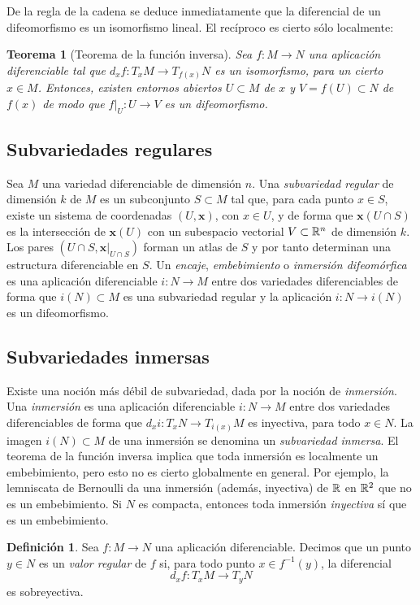 \documentclass[11pt,a4paper]{amsbook}
\newtheorem{thm}[subsection]{Teorema}
\theoremstyle{remark} \newtheorem{rmk}[subsection]{Observación}
\theoremstyle{definition} \newtheorem{defn}[subsection]{Definición}
\theoremstyle{definition} \newtheorem{ex}[subsection]{Ejemplo}
\theoremstyle{definition} \newtheorem{ej}[subsection]{Ejercicio}
\begin{document}
De la regla de la cadena se deduce inmediatamente que la diferencial de un difeomorfismo es un isomorfismo lineal. El recíproco es cierto sólo localmente:

\begin{thm}[Teorema de la función inversa]
Sea $f:M\rightarrow N$ una aplicación diferenciable tal que $d_xf:T_xM\rightarrow T_{f(x)}N$ es un isomorfismo, para un cierto $x\in M$. Entonces, existen entornos abiertos $U\subset M$ de $x$ y $V=f(U)\subset N$ de $f(x)$ de modo que $f|_U:U\rightarrow V$ es un difeomorfismo.
\end{thm}

\subsection{Subvariedades regulares} Sea $M$ una variedad diferenciable de dimensión $n$. Una \emph{subvariedad regular} de dimensión $k$ de $M$ es un subconjunto $S\subset M$ tal que, para cada punto $x\in S$, existe un sistema de coordenadas $(U,\bm{x})$, con $x\in U$, y de forma que $\bm{x}(U\cap S)$ es la intersección de $\bm{x}(U)$ con un subespacio vectorial $V\subset \mathbb R^n$ de dimensión $k$. Los pares $(U\cap S, \bm{x}|_{U\cap S})$ forman un atlas de $S$ y por tanto determinan una estructura diferenciable en $S$.
Un \emph{encaje}, \emph{embebimiento} o \emph{inmersión difeomórfica} es una aplicación diferenciable $i:N\rightarrow M$ entre dos variedades diferenciables de forma que $i(N)\subset M$ es una subvariedad regular y la aplicación $i:N\rightarrow i(N)$ es un difeomorfismo.

\subsection{Subvariedades inmersas} Existe una noción más débil de subvariedad, dada por la noción de \emph{inmersión}. Una \emph{inmersión} es una aplicación diferenciable $i:N\rightarrow M$ entre dos variedades diferenciables de forma que $d_xi: T_xN\rightarrow T_{i(x)}M$ es inyectiva, para todo $x\in N$. La imagen $i(N)\subset M$ de una inmersión se denomina un \emph{subvariedad inmersa}. El teorema de la función inversa implica que toda inmersión es localmente un embebimiento, pero esto no es cierto globalmente en general. Por ejemplo, la lemniscata de Bernoulli da una inmersión (además, inyectiva) de $\mathbb R$ en $\mathbb R^2$ que no es un embebimiento. Si $N$ es compacta, entonces toda inmersión \textit{inyectiva} sí que es un embebimiento.

\begin{defn}
  Sea $f:M\rightarrow N$ una aplicación diferenciable. Decimos que un punto $y\in N$ es un \emph{valor regular} de $f$ si, para todo punto $x\in f^{-1}(y)$, la diferencial
  \begin{equation*}
d_x f: T_x M \rightarrow T_y N
  \end{equation*}
  es sobreyectiva.
\end{defn}
\end{document}

